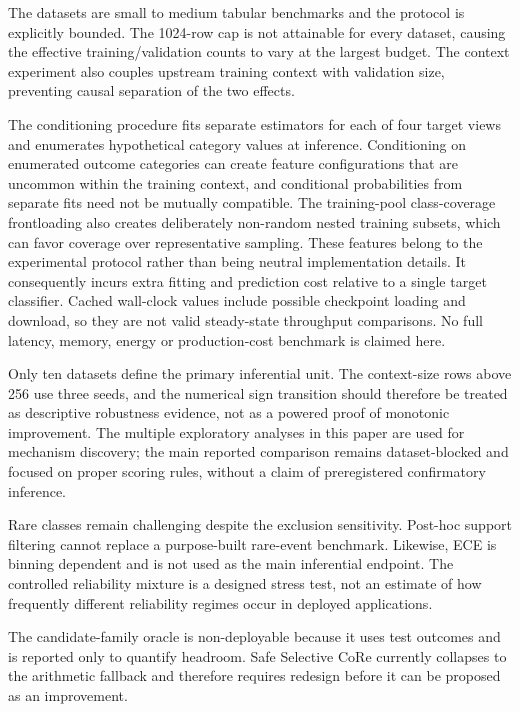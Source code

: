 \documentclass[a4paper,fleqn]{cas-sc}
\begin{document}
The datasets are small to medium tabular benchmarks and the protocol is explicitly bounded. The 1024-row cap is not attainable for every dataset, causing the effective training/validation counts to vary at the largest budget. The context experiment also couples upstream training context with validation size, preventing causal separation of the two effects.

The conditioning procedure fits separate estimators for each of four target views and enumerates hypothetical category values at inference. Conditioning on enumerated outcome categories can create feature configurations that are uncommon within the training context, and conditional probabilities from separate fits need not be mutually compatible. The training-pool class-coverage frontloading also creates deliberately non-random nested training subsets, which can favor coverage over representative sampling. These features belong to the experimental protocol rather than being neutral implementation details. It consequently incurs extra fitting and prediction cost relative to a single target classifier. Cached wall-clock values include possible checkpoint loading and download, so they are not valid steady-state throughput comparisons. No full latency, memory, energy or production-cost benchmark is claimed here.

Only ten datasets define the primary inferential unit. The context-size rows above 256 use three seeds, and the numerical sign transition should therefore be treated as descriptive robustness evidence, not as a powered proof of monotonic improvement. The multiple exploratory analyses in this paper are used for mechanism discovery; the main reported comparison remains dataset-blocked and focused on proper scoring rules, without a claim of preregistered confirmatory inference.

Rare classes remain challenging despite the exclusion sensitivity. Post-hoc support filtering cannot replace a purpose-built rare-event benchmark. Likewise, ECE is binning dependent and is not used as the main inferential endpoint. The controlled reliability mixture is a designed stress test, not an estimate of how frequently different reliability regimes occur in deployed applications.

The candidate-family oracle is non-deployable because it uses test outcomes and is reported only to quantify headroom. Safe Selective CoRe currently collapses to the arithmetic fallback and therefore requires redesign before it can be proposed as an improvement.
\end{document}
